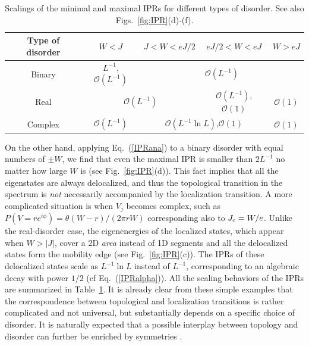 \documentclass{tADP2e}
\theoremstyle{plain}
\theoremstyle{plain}
\theoremstyle{definition}
\begin{document}
\begin{table}[t]
\caption{\label{table:IPR} {Scalings of the minimal and maximal IPRs for different types of disorder. See also Figs.~\ref{fig:IPR}(d)-(f).}}
\footnotesize
\begin{tabular}{c|cccc}
\hline\hline
\;\;\;\;\;Type of disorder\;\;\;\;\; & \;\;\;\;\;\;$W<J$\;\;\;\;\;\; &  \multicolumn{1}{|c|}{\;\;\;\;\;\;\;$J<W<eJ/2$\;\;\;\;\;\;\;} & \;\;\;\;\;\;\;$eJ/2< W < eJ$\;\;\;\;\;\;\; &  \multicolumn{1}{|c}{ \;\;\;\;\;\;$W> eJ$\;\;\;\;\;\; }\\ 
\hline
Binary & $L^{-1}$,\;$\mathcal{O}(L^{-1})$ & \multicolumn{3}{|c}{%
$\mathcal{O}(L^{-1})$} \\
\hline
Real &  \multicolumn{2}{c|}{%
$\mathcal{O}(L^{-1})$} & $\mathcal{O}(L^{-1})$,\;$\mathcal{O}(1)$  &  \multicolumn{1}{|c}{ %
$\mathcal{O}(1)$} \\
\hline
Complex & $\mathcal{O}(L^{-1})$ & \multicolumn{2}{|c}{%
$\mathcal{O}(L^{-1}\ln L)$,\;$\mathcal{O}(1)$} &  \multicolumn{1}{|c}{$\mathcal{O}(1)$} \\
\hline\hline
\end{tabular}
\end{table}


On the other hand, applying Eq.~(\ref{IPRana}) to a binary disorder with equal numbers of $\pm W$, we find that even the maximal IPR is smaller than $2L^{-1}$ no matter how large $W$ is (see Fig.~\ref{fig:IPR}(d)). This fact implies that all the eigenstates are always delocalized, and thus the topological transition in the spectrum is \emph{not} necessarily accompanied by the localization transition. A more complicated situation is when $V_j$ becomes complex, such as $P(V=re^{i\phi})=\theta (W-r)/(2\pi rW)$ corresponding also to $J_{\rm c}=W/e$. Unlike the real-disorder case, the eigenenergies of the localized states, which appear when $W>|J|$, cover a 2D \emph{area} instead of 1D segments and all the delocalized states form the mobility edge (see Fig.~\ref{fig:IPR}(c)). The IPRs of these delocalized states scale as $L^{-1}\ln L$ instead of $L^{-1}$, corresponding to an algebraic decay with power $1/2$ (cf Eq.~(\ref{IPRalpha})). {All the scaling behaviors of the IPRs are summarized in Table~\ref{table:IPR}.}
It is already clear from these simple examples that the correspondence between topological and localization transitions is rather complicated and not universal, but substantially depends on a specific choice of disorder. It is naturally expected that a possible interplay between topology and disorder can further be enriched by symmetries \cite{KK20}. 
\end{document}
